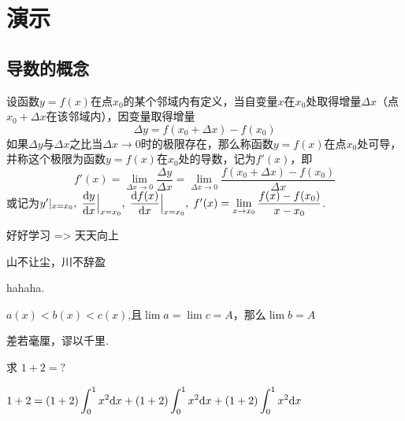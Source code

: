 \documentclass[12pt, a4paper,oneside, UTF8]{ctexbook}
\begin{document}
% 
\else
\fi

\chapter{演示}
\section{导数的概念}

\begin{defn}
    设函数$y=f(x)$在点$x_0$的某个邻域内有定义，当自变量$x$在$x_0$处取得增量$\Delta{x}$（点$x_0+\Delta{x}$在该邻域内），因变量取得增量
    \[ \Delta{y}=f(x_0+\Delta{x})-f(x_0) \]
    如果$\Delta{y}$与$\Delta{x}$之比当$\Delta{x}\to 0$时的极限存在，那么称函数$y=f(x)$在点$x_0$处可导，并称这个极限为函数$y=f(x)$在$x_0$处的导数，记为$f'(x)$，即
    \[
        f'(x) = \lim_{\Delta{x}\to0}\frac{\Delta{y}}{\Delta{x}} = \lim_{\Delta{x}\to 0}\frac{f(x_0+\Delta{x})-f(x_0)}{\Delta{x}}
    \]
    或记为$y'|_{x=x_0},\;\dfrac{\textup{d} y}{\textup{d} x}\Big|_{x = x_0},\;\dfrac{\textup{d} f(x)}{\textup{d} x}\Big|_{x=x_0},\;f'(x) = \lim\limits_{x\to x_0}\dfrac{f(x)-f(x_0)}{x-x_0}$.
\end{defn}

\begin{lemma}[瞎编的引理]
    好好学习 => 天天向上
\end{lemma}

\begin{thm}[瞎编的定理]
    山不让尘，川不辞盈
\end{thm}

\begin{corollary}[瞎编的推论]
    hahaha.
\end{corollary}

\begin{criterion}[夹逼准则]
    $a(x) < b(x) < c(x)$,且$\lim{a} = \lim{c} = A$，那么$\lim{b} = A$
\end{criterion}

\begin{proposition}
    差若毫厘，谬以千里.
\end{proposition}

\begin{example}
    求 $ 1+2 = ?$
\end{example}

\begin{solution}
    $\displaystyle 1 + 2 = (1+2)\int_0^1 x^2 \textup{d} x + (1+2)\int_0^1 x^2 \textup{d} x + (1+2)\int_0^1 x^2 \textup{d} x$
\end{solution}
\end{document}
